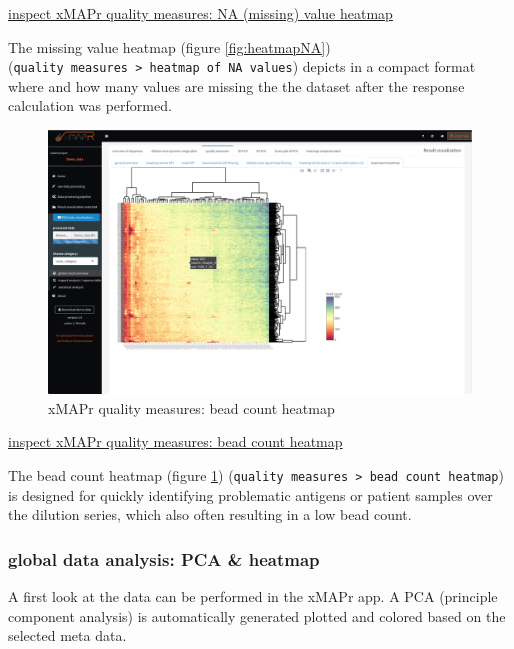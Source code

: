\documentclass[
]{book}
\begin{document}
\href{figures/quality_measures__NA_value_heatmap.png}{inspect xMAPr quality measures: NA (missing) value heatmap}

The missing value heatmap (figure \ref{fig:heatmapNA}) (\texttt{quality\ measures\ \textgreater{}\ heatmap\ of\ NA\ values}) depicts in a compact format where and how many values are missing the the dataset after the response calculation was performed.

\begin{figure}
\includegraphics[width=50.5in]{figures/quality_measures__bead_count_heatmap} \caption{xMAPr quality measures: bead count heatmap}\label{fig:heatmapBeadCount}
\end{figure}

\href{figures/quality_measures__bead_count_heatmap.png}{inspect xMAPr quality measures: bead count heatmap}

The bead count heatmap (figure \ref{fig:heatmapBeadCount}) (\texttt{quality\ measures\ \textgreater{}\ bead\ count\ heatmap}) is designed for quickly identifying problematic antigens or patient samples over the dilution series, which also often resulting in a low bead count.

\subsubsection{global data analysis: PCA \& heatmap}\label{global-data-analysis-pca-heatmap}

A first look at the data can be performed in the xMAPr app. A PCA (principle component analysis) is automatically generated plotted and colored based on the selected meta data.
\end{document}
